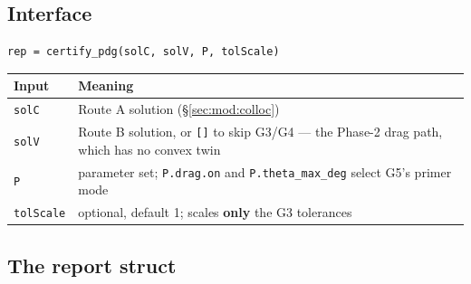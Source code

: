 \documentclass[11pt]{article}
\begin{document}
\subsection{Interface}

\begin{verbatim}
rep = certify_pdg(solC, solV, P, tolScale)
\end{verbatim}

\begin{center}
\begin{tabular}{@{}lL{9.8cm}@{}}
\toprule
Input & Meaning \\
\midrule
\texttt{solC} & Route A solution (\S\ref{sec:mod:colloc}) \\
\texttt{solV} & Route B solution, or \texttt{[]} to skip G3/G4 --- the
  Phase-2 drag path, which has no convex twin \\
\texttt{P} & parameter set; \texttt{P.drag.on} and
  \texttt{P.theta\_max\_deg} select G5's primer mode \\
\texttt{tolScale} & optional, default 1; scales \textbf{only} the G3
  tolerances \\
\bottomrule
\end{tabular}
\end{center}

\subsection{The report struct}
\end{document}
